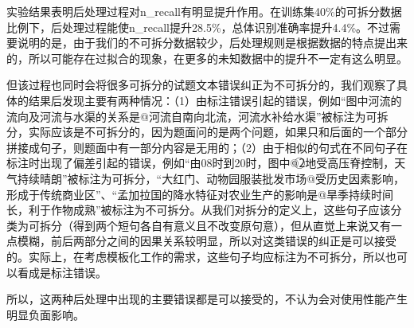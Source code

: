 \documentclass[master, winfont]{njuthesis}
\begin{document}
\begin{center}
\begin{table}[!htbp]
\caption{\label{postprocess} 后处理的影响}
\end{table}
\end{center}

实验结果表明后处理过程对n\_recall有明显提升作用。在训练集40\%的可拆分数据比例下，后处理过程能使n\_recall提升28.5\%，总体识别准确率提升4.4\%。不过需要说明的是，由于我们的不可拆分数据较少，后处理规则是根据数据的特点提出来的，所以可能存在过拟合的现象，在更多的未知数据中的提升不一定有这么明显。

但该过程也同时会将很多可拆分的试题文本错误纠正为不可拆分的，我们观察了具体的结果后发现主要有两种情况：（1）由标注错误引起的错误，例如“图中河流的流向及河流与水渠的关系是@河流自南向北流，河流水补给水渠”被标注为可拆分，实际应该是不可拆分的，因为题面问的是两个问题，如果只和后面的一个部分拼接成句子，则题面中有一部分内容是无用的；（2）由于相似的句式在不同句子在标注时出现了偏差引起的错误，例如“由08时到20时，图中@\textcircled{2}地受高压脊控制，天气持续晴朗”被标注为可拆分，“大红门、动物园服装批发市场@受历史因素影响，形成于传统商业区”、“孟加拉国的降水特征对农业生产的影响是@旱季持续时间长，利于作物成熟”被标注为不可拆分。从我们对拆分的定义上，这些句子应该分类为可拆分（得到两个短句各自有意义且不改变原句意），但从直觉上来说又有一点模糊，前后两部分之间的因果关系较明显，所以对这类错误的纠正是可以接受的。实际上，在考虑模板化工作的需求，这些句子均应标注为不可拆分，所以也可以看成是标注错误。

所以，这两种后处理中出现的主要错误都是可以接受的，不认为会对使用性能产生明显负面影响。
\end{document}
